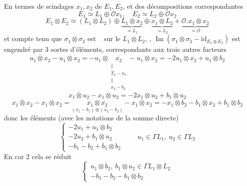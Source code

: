 \documentclass[11pt,a4paper]{article}
\begin{document}
En termes de scindages $x_1, x_2$ de $E_1, E_2$, et des décompositions correspondantes
\[
  E_1 \simeq L_1 \oplus \mathcal{O} x_1 , \quad E_2 \simeq L_2 \oplus \mathcal{O} x_2
\]
\[
  E_1 \otimes E_2 \simeq (L_1 \otimes L_2) \oplus \underbrace{L_1 \otimes x_2}_{\simeq L_1} \oplus \underbrace{x_1 \otimes L_2}_{\simeq L_2} + \underbrace{\mathcal{O} . x_1 \otimes x_2}_{\simeq \mathcal{O}}
\]
et compte tenu que $\sigma_1 \otimes \sigma_2$  est \  sur le \ill{} $L_1 \otimes L_2$, \struck{\ill{}}, $\operatorname{Im}(\sigma_1 \otimes \sigma_2 - \mathrm{id}_{E_1 \otimes E_2})$ est engendré par 3 sortes d'éléments, correspondants aux trois autres facteurs
\[
  \overline{u_1 \otimes x_2} - u_1 \otimes x_2 = -u_1 \otimes \underset{\substack{\| \\ T_2 - x_2 \\ \| \\ x_2 - b_2}}{\overline{x_2}} - u_1 \otimes x_2 = -2u_1 \otimes x_2 + u_1 \otimes b_2
\]
\[
  \overline{x_1 \otimes u_2} - x_1 \otimes u_2 = -2x_1 \otimes u_2 + b_1 \otimes u_2
\]
\[
  \overline{x_1 \otimes x_2} - x_1 \otimes x_2 = \underset{(x_1 - b_1) \otimes (x_2 - b_2)}{\overline{x_1} \otimes \overline{x_2}} - x_1 \otimes x_2 = -x_1 \otimes b_2 - b_1 \otimes x_2 + b_1 \otimes b_2
\]
donc les éléments (avec les notations de la somme directe)
\[
  \begin{cases}
    -2u_1 + u_1 \otimes b_2 \\
    -2u_2 + b_1 \otimes u_2 \\
    -b_1 - b_2 + b_1 \otimes b_2
  \end{cases}
  \qquad u_1 \in \Gamma L_1 , \ u_2 \in \Gamma L_2
\]
En car 2 cela se réduit
\[
  \begin{cases}
    u_1 \otimes b_2 , \ b_1 \otimes u_2 \in \Gamma L_1 \otimes L_2 \\
    -b_1 - b_2 - b_1 \otimes b_2
  \end{cases}
\]
\end{document}
